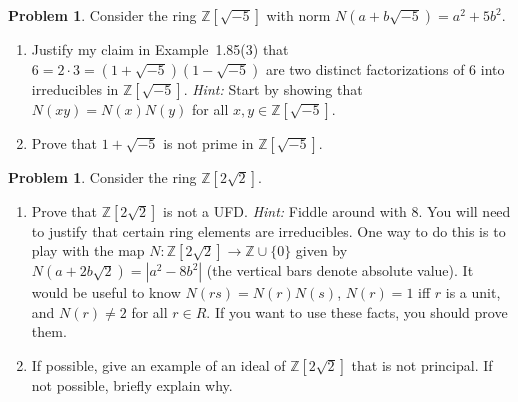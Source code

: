 \documentclass[11pt]{scrartcl}
\theoremstyle{definition}
\newtheorem{problem}[theorem]{Problem}
\begin{document}
\begin{problem}
Consider the ring $\mathbb{Z}[\sqrt{-5}]$ with norm $N(a+b\sqrt{-5})=a^2+5b^2$.  
\begin{enumerate}[label=\rm{(\alph*)}]
\item Justify my claim in Example~1.85(3) that $6=2\cdot 3=(1+\sqrt{-5})(1-\sqrt{-5})$ are two distinct factorizations of 6 into irreducibles in $\mathbb{Z}[\sqrt{-5}]$. \emph{Hint:} Start by showing that $N(xy)=N(x)N(y)$ for all $x,y\in \mathbb{Z}[\sqrt{-5}]$.
\item Prove that $1+\sqrt{-5}$ is not prime in $\mathbb{Z}[\sqrt{-5}]$.
\end{enumerate}
\end{problem}

\begin{problem}
Consider the ring $\mathbb{Z}[2\sqrt{2}]$.
\begin{enumerate}[label=\rm{(\alph*)}]
\item Prove that $\mathbb{Z}[2\sqrt{2}]$ is not a UFD. \emph{Hint:} Fiddle around with 8.  You will need to justify that certain ring elements are irreducibles.  One way to do this is to play with the map $N:\mathbb{Z}[2\sqrt{2}]\to \mathbb{Z}\cup\{0\}$ given by $N(a+2b\sqrt{2})=|a^2-8b^2|$ (the vertical bars denote absolute value). It would be useful to know $N(rs)=N(r)N(s)$, $N(r)=1$ iff $r$ is a unit, and $N(r)\neq 2$ for all $r\in R$. If you want to use these facts, you should prove them.
\item If possible, give an example of an ideal of $\mathbb{Z}[2\sqrt{2}]$ that is not principal.  If not possible, briefly explain why.
\end{enumerate}
\end{problem}
\end{document}
